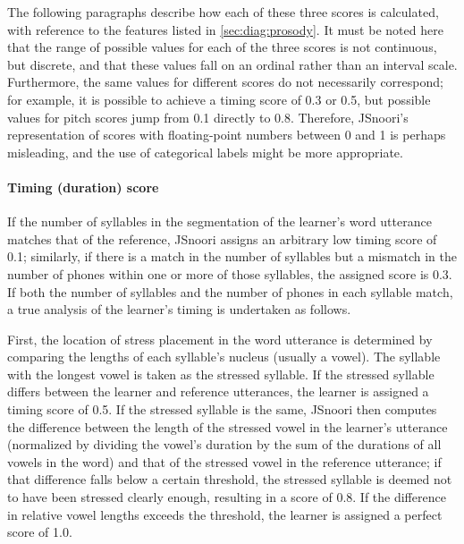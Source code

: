 	The following paragraphs describe how each of these three scores is calculated, with reference to the features listed in \cref{sec:diag:prosody}. It must be noted here that the range of possible values for each of the three scores is not continuous, but discrete, and that these values fall on an ordinal rather than an interval scale. Furthermore, the same values for different scores do not necessarily correspond; for example, it is possible to achieve a timing score of 0.3 or 0.5, but possible values for pitch scores jump from 0.1 directly to 0.8.
	Therefore, JSnoori's representation of scores with floating-point numbers between 0 and 1 is perhaps misleading, and the use of categorical labels might be more appropriate.
	
	
	
	\paragraph{Timing (duration) score}
	
	If the number of syllables in the segmentation of the learner's word utterance matches that of the reference, JSnoori assigns an arbitrary low timing score of 0.1; similarly, if there is a match in the number of syllables but a mismatch in the number of phones within one or more of those syllables, the assigned score is 0.3. 
	If both the number of syllables and the number of phones in each syllable match, a true analysis of the learner's timing is undertaken as follows.
	
	First, the location of stress placement in the word utterance is determined by comparing the lengths of each syllable's nucleus (usually a vowel).
	The syllable with the longest vowel is taken as the stressed syllable. If the stressed syllable differs between the learner and reference utterances, the learner is assigned a timing score of 0.5. If the stressed syllable is the same, JSnoori then computes the difference between the length of the stressed vowel in the learner's utterance (normalized by dividing the vowel's duration by the sum of the durations of all vowels in the word) and that of the stressed vowel in the reference utterance; if that difference falls below a certain threshold,
	the stressed syllable is deemed not to have been stressed clearly enough, resulting in a score of 0.8. If the difference in relative vowel lengths exceeds the threshold, the learner is assigned a perfect score of 1.0.
	
